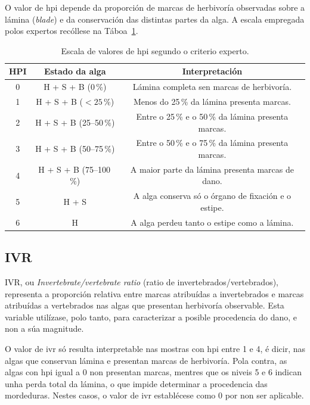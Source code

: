 O valor de \gls{hpi} depende da proporción de marcas de herbivoría observadas sobre a lámina
(\textit{blade}) e da conservación das distintas partes da alga. A escala empregada polos expertos
recóllese na Táboa~\ref{tab:escala-hpi}.

{
\begin{table}[htbp]
  \centering
  \begin{tabular}{c|c|c}
  \rowcolor{udcpink!25}
  \textbf{HPI} & \textbf{Estado da alga} & \textbf{Interpretación} \\\hline
  0 & H + S + B (0\,\%) & Lámina completa sen marcas de herbivoría. \\
  1 & H + S + B ($<25$\,\%) & Menos do 25\,\% da lámina presenta marcas. \\
  2 & H + S + B (25--50\,\%) & Entre o 25\,\% e o 50\,\% da lámina presenta marcas. \\
  3 & H + S + B (50--75\,\%) & Entre o 50\,\% e o 75\,\% da lámina presenta marcas. \\
  4 & H + S + B (75--100\,\%) & A maior parte da lámina presenta marcas de dano. \\
  5 & H + S & A alga conserva só o órgano de fixación e o estipe. \\
  6 & H & A alga perdeu tanto o estipe como a lámina. \\
  \end{tabular}
  \caption{Escala de valores de \gls{hpi} segundo o criterio experto.}
  \label{tab:escala-hpi}
\end{table}
}

\subsection{IVR}
IVR, ou \textit{Invertebrate/vertebrate ratio} (ratio de invertebrados/vertebrados), representa a
proporción relativa entre marcas atribuídas a invertebrados e marcas atribuídas a vertebrados nas
algas que presentan herbivoría observable. Esta variable utilízase, polo tanto, para caracterizar a
posible procedencia do dano, e non a súa magnitude.

O valor de \gls{ivr} só resulta interpretable nas mostras con \gls{hpi} entre 1 e 4, é dicir, nas
algas que conservan lámina e presentan marcas de herbivoría. Pola contra, as algas con \gls{hpi} igual
a 0 non presentan marcas, mentres que os niveis 5 e 6 indican unha perda total da lámina,
o que impide determinar a procedencia das mordeduras. Nestes casos, o valor de \gls{ivr} establécese
como 0 por non ser aplicable.

